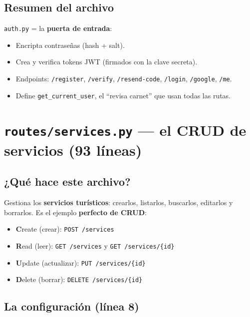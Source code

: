 \documentclass[11pt,a4paper]{article}
\begin{document}
\subsection{Resumen del archivo}

\begin{recuadro}
\texttt{auth.py} = la \textbf{puerta de entrada}:
\begin{itemize}
    \item Encripta contraseñas (hash + salt).
    \item Crea y verifica tokens JWT (firmados con la clave secreta).
    \item Endpoints: \texttt{/register}, \texttt{/verify}, \texttt{/resend-code},
    \texttt{/login}, \texttt{/google}, \texttt{/me}.
    \item Define \texttt{get\_current\_user}, el ``revisa carnet'' que usan todas las rutas.
\end{itemize}
\end{recuadro}

\section{\texttt{routes/services.py} --- el CRUD de servicios (93 líneas)}

\subsection{¿Qué hace este archivo?}

Gestiona los \textbf{servicios turísticos}: crearlos, listarlos, buscarlos, editarlos y
borrarlos. Es el ejemplo \textbf{perfecto de CRUD}:
\begin{itemize}
    \item \textbf{C}reate (crear): \texttt{POST /services}
    \item \textbf{R}ead (leer): \texttt{GET /services} y \texttt{GET /services/\{id\}}
    \item \textbf{U}pdate (actualizar): \texttt{PUT /services/\{id\}}
    \item \textbf{D}elete (borrar): \texttt{DELETE /services/\{id\}}
\end{itemize}

\subsection{La configuración (línea 8)}
\end{document}

